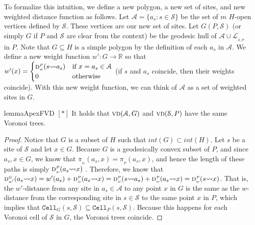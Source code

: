 \documentclass[a4paper,UKenglish]{socg-lipics-v2018}
\newcommand{\s}{\mathcal S}
\newcommand{\dd}[3][P]{\ensuremath{\textsc{d}_{\scriptscriptstyle w}^{\scriptscriptstyle #1}(#2 {\leadsto} #3)}}
\newcommand{\ddw}[3][P]{\ensuremath{\textsc{d}_{\scriptscriptstyle w'}^{\scriptscriptstyle #1}(#2 {\leadsto} #3)}}
\newcommand{\p}[3][P]{\ensuremath{\pi_{_{#1}}(#2, #3)}}
\newcommand{\cell}[2][P]{\ensuremath{\mathtt{Cell}_{\scriptscriptstyle #1}(#2)}}
\newcommand{\vd}[2][P]{\textsc{vd}(#2, #1)}
\newcommand{\LL}[1][\s, P]{\ensuremath{\mathcal L_{_{#1}}}}
\newcommand{\A}{\ensuremath{\mathcal A}}
\begin{document}
To formalize this intuition, we define a new polygon, a new set of sites, and new weighted distance function as follows.
Let $\A = \{a_s: s\in \s\}$ be the set of $m$ $H$-open vertices defined by $\s$. These vertices are our new set of sites.
Let $G(P, \s)$ (or simply $G$ if $P$ and $\s$ are clear from the context) be the geodesic hull of $\A\cup \LL$ in $P$.
Note that $G\subseteq H$ is a simple polygon by the definition of each $a_s$ in $\A$.
We define a new weight function $w':G\to \mathbb{R}$ so that $w'(x) = \begin{cases} \dd{s}{a_s}& \text{if }x=a_s\in \A \\ 0&\text{otherwise} \end{cases}$  (if $s$ and $a_s$ coincide, then their weights coincide).
With this new weight function, we can think of $\A$ as a set of weighted sites in $G$.

\begin{restatable}{lemma}{ApexFVD}\label{lemma:ApexFVD}
$[*]$ It holds that $\vd[G]{\A}$ and $\vd[P]{\s}$ have the same Voronoi trees.
\end{restatable}
\begin{proof}
Notice that $G$ is a subset of $H$ such that $int(G)\subset int(H)$.
Let $s$ be a site of $\s$ and let $x\in G$. 
Because $G$ is a geodesically convex subset of $P$, and since $a_s, x\in G$, we know that $\p[G]{a_s}{x} = \p{a_s}{x}$, and hence the length of these paths is simply $\dd{a_s}{x}$ . 
Therefore, we know that  $\ddw[G]{a_s}{x} = w'(a_s) + \dd{a_s}{x} = \dd{s}{a_s} + \dd{a_s}{x} = \dd{s}{x}$.
That is, the $w'$-distance from any site in $a_s \in \A$ to any point $x$ in $G$ is the same as the $w$-distance from the corresponding site in $s\in \s$ to the same point $x$ in $P$, which implies that $\cell[G]{s, \s} \subseteq \cell{s, \s}$. 
Because this happens for each Voronoi cell of $\s$ in $G$, the Voronoi trees coincide. 
\end{proof}
\end{document}
